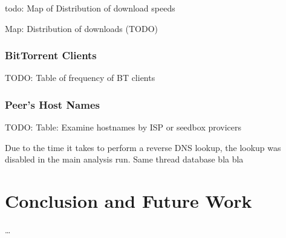 \documentclass[10pt, a4paper, twoside, headsepline]{scrbook}
\renewcommand{\_}{\origunderscore\allowbreak}
\begin{document}
todo: Map of Distribution of download speeds

Map: Distribution of downloads (TODO)

\subsection{BitTorrent Clients}
\label{clients}
TODO: Table of frequency of BT clients

\subsection{Peer's Host Names}
TODO: Table: Examine hostnames by ISP or seedbox provicers

Due to the time it takes to perform a reverse DNS lookup, the lookup was disabled in the main analysis run. Same thread database bla bla

\chapter{Conclusion and Future Work}
\dots

\printbibheading[heading=bibintoc]
\begingroup
\setlength{}
\printbibliography[heading=subbibintoc, title={Literature}, keyword=science]
\printbibliography[heading=subbibintoc, title={Software}, keyword=software]
\printbibliography[heading=subbibintoc, title={Online}, keyword=online]
\printbibliography[heading=subbibintoc, title={Other}, notkeyword=science, notkeyword=standard, notkeyword=software, notkeyword=online] %
\endgroup
\printbibliography[heading=subbibintoc, title={Standards}, keyword=standard]
\end{document}
